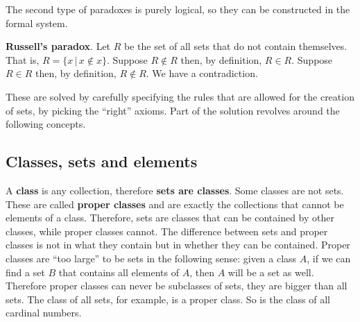 \documentclass{bareminimum}
\begin{document}
The second type of paradoxes is purely logical, so they can be constructed in the formal system.

\textbf{Russell's paradox}. Let $R$ be the set of all sets that do not contain themselves. That is, $R=\{ x \, | \, x \notin x\}$. Suppose $R \notin R$ then, by definition, $R \in R$. Suppose $R \in R$ then, by definition, $R \notin R$. We have a contradiction.

These are solved by carefully specifying the rules that are allowed for the creation of sets, by picking the ``right'' axioms. Part of the solution revolves around the following concepts.



\subsection{Classes, sets and elements}

A \textbf{class}   is any collection, therefore \textbf{sets are classes}. Some classes are not sets. These are called \textbf{proper classes} and are exactly the collections that cannot be elements of a class. Therefore, sets are classes that can be contained by other classes, while proper classes cannot. The difference between sets and proper classes is not in what they contain but in whether they can be contained. Proper classes are ``too large'' to be sets in the following sense: given a class $A$, if we can find a set $B$ that contains all elements of $A$, then $A$ will be a set as well. Therefore proper classes can never be subclasses of sets, they are bigger than all sets. The class of all sets, for example, is a proper class. So is the class of all cardinal numbers.
\end{document}
